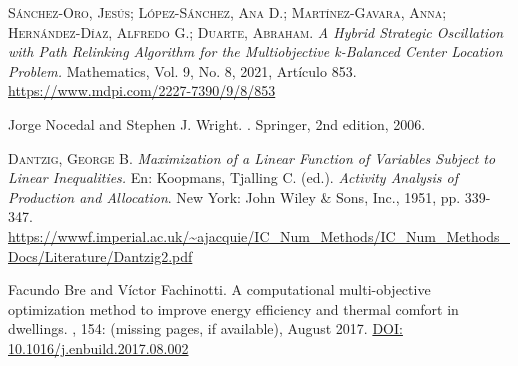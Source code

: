 \documentclass[12pt,a4paper]{book}
\begin{document}
\begin{thebibliography}{X}
     \textsc{Sánchez-Oro, Jesús; López-Sánchez, Ana D.; Martínez-Gavara, Anna; Hernández-Díaz, Alfredo G.; Duarte, Abraham}. \textit{A Hybrid Strategic Oscillation with Path Relinking Algorithm for the Multiobjective k-Balanced Center Location Problem.} Mathematics, Vol. 9, No. 8, 2021, Artículo 853. \url{https://www.mdpi.com/2227-7390/9/8/853}

    Jorge Nocedal and Stephen J. Wright.
    .
    \newblock Springer, 2nd edition, 2006.

     \textsc{Dantzig, George B.} \textit{Maximization of a Linear Function of Variables Subject to Linear Inequalities.} En: Koopmans, Tjalling C. (ed.). \textit{Activity Analysis of Production and Allocation}. New York: John Wiley \& Sons, Inc., 1951, pp. 339-347. \url{https://wwwf.imperial.ac.uk/~ajacquie/IC_Num_Methods/IC_Num_Methods_Docs/Literature/Dantzig2.pdf}

    Facundo Bre and Víctor Fachinotti.
    \newblock A computational multi-objective optimization method to improve energy efficiency and thermal comfort in dwellings.
    , 154: (missing pages, if available), August 2017.
    \newblock \href{https://doi.org/10.1016/j.enbuild.2017.08.002}{DOI: 10.1016/j.enbuild.2017.08.002}
    

\end{thebibliography}
\end{document}
